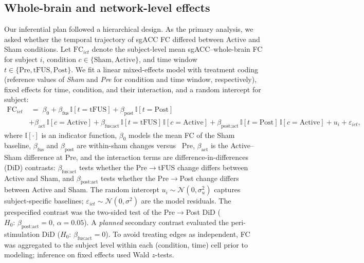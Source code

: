 \subsection*{Whole-brain and network-level effects}
\noindent
Our inferential plan followed a hierarchical design. As the primary analysis, we asked whether the temporal trajectory of sgACC FC differed between Active and Sham conditions. Let $\mathrm{FC}_{ict}$ denote the subject-level mean sgACC–whole-brain FC for subject $i$, condition $c\in\{\text{Sham},\text{Active}\}$, and time window $t\in\{\text{Pre},\text{tFUS},\text{Post}\}$. We fit a linear mixed-effects model with treatment coding (reference values of \emph{Sham} and \emph{Pre} for condition and time window, respectively), fixed effects for time, condition, and their interaction, and a random intercept for subject:
\[
\begin{aligned}
\mathrm{FC}_{ict} &\;=\; \beta_0
+ \beta_{\text{fus}}\,\mathbb{I}[t=\text{tFUS}]
+ \beta_{\text{post}}\,\mathbb{I}[t=\text{Post}] \\
& + \beta_{\text{act}}\,\mathbb{I}[c=\text{Active}]
+ \beta_{\text{fus:act}}\,\mathbb{I}[t=\text{tFUS}]\,\mathbb{I}[c=\text{Active}]
+ \beta_{\text{post:act}}\,\mathbb{I}[t=\text{Post}]\,\mathbb{I}[c=\text{Active}]
+ u_i + \varepsilon_{ict},
\end{aligned}
\]
where $\mathbb{I}[\cdot]$ is an indicator function, $\beta_0$ models the mean FC of the Sham baseline, $\beta_{\text{fus}}$ and $\beta_{\text{post}}$ are within-sham changes versus \ Pre, $\beta_{\text{act}}$ is the Active–Sham difference at Pre, and the interaction terms are difference-in-differences (DiD) contrasts: $\beta_{\text{fus:act}}$ tests whether the Pre$\rightarrow$tFUS change differs between Active and Sham, and $\beta_{\text{post:act}}$ tests whether the Pre$\rightarrow$Post change differs between Active and Sham. The random intercept $u_i\sim\mathcal{N}(0,\sigma_u^2)$ captures subject-specific baselines; $\varepsilon_{ict}\sim\mathcal{N}(0,\sigma^2)$ are the model residuals. The prespecified contrast was the two-sided test of the Pre$\rightarrow$Post DiD ($H_0\!:\,\beta_{\text{post:act}}=0$, $\alpha=0.05$). A \emph{planned} secondary contrast evaluated the peri-stimulation DiD ($H_0\!:\,\beta_{\text{fus:act}}=0$). To avoid treating edges as independent, FC was aggregated to the subject level within each (condition, time) cell prior to modeling; inference on fixed effects used Wald $z$-tests.

